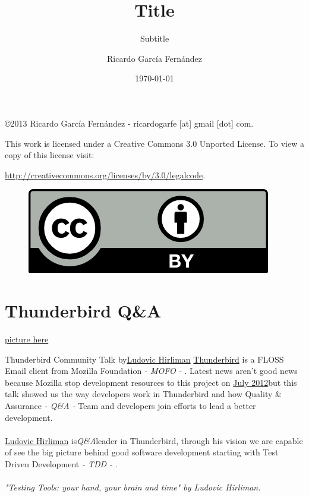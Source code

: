\documentclass[11pt]{scrartcl}
\title{\textbf{Title}}
\subtitle{Subtitle}
\author{Ricardo Garc\'ia Fern\'andez}
\date{\today}
\begin{document}
\maketitle

\vfill

\begin{flushright}
    \copyright  2013 Ricardo Garc\'ia Fern\'andez - ricardogarfe [at] gmail [dot] com.

    This work is licensed under a Creative Commons 3.0 Unported License.
    To view a copy of this license visit:
 
    \url{http://creativecommons.org/licenses/by/3.0/legalcode}.
\end{flushright}

\begin{figure}[h]
    \begin{flushright}	
        \includegraphics{by}
        \label{fig:by}
    \end{flushright}
\end{figure}

\newpage

\section{Thunderbird Q\&A}
\label{sec:thunderbird-qa}

\href{http://www2.telta.de/sites/default/files/anleitungen/img-smtpauththbird/thbird.gif}{picture here}

Thunderbird Community Talk by\href{https://twitter.com/lhirlimann}{Ludovic Hirliman}
\href{http://www.mozilla.org/es-ES/thunderbird/}{Thunderbird} is a FLOSS Email client from Mozilla Foundation \textit{- MOFO -} . Latest news aren't good news because Mozilla stop development resources to this project on \href{https://blog.lizardwrangler.com/2012/07/06/thunderbird-stability-and-community-innovation/}{July 2012}but this talk showed us the way developers work in Thunderbird and how Quality \& Assurance \textit{- Q\&A -} Team and developers join efforts to lead a better development.
\\
\\\href{http://perso.hirlimann.net/~ludo/}{Ludovic Hirliman} is\textit{Q\&A}leader in Thunderbird, through his vision we are capable of see the big picture behind good software development starting with Test Driven Development \textit{- TDD -} .
\\
\\\textit{"Testing Tools: your hand, your brain and time" by Ludovic Hirliman.}
\end{document}
